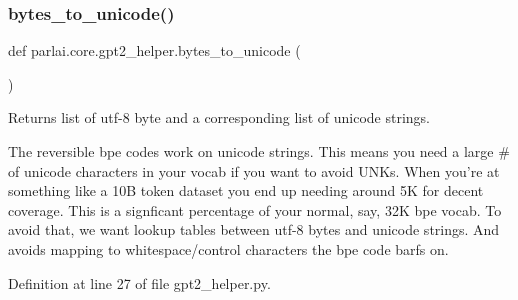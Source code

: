 \subsubsection{\texorpdfstring{bytes\+\_\+to\+\_\+unicode()}{bytes\_to\_unicode()}}
{\footnotesize\ttfamily def parlai.\+core.\+gpt2\+\_\+helper.\+bytes\+\_\+to\+\_\+unicode (\begin{DoxyParamCaption}{ }\end{DoxyParamCaption})}

\begin{DoxyVerb}Returns list of utf-8 byte and a corresponding list of unicode strings.

The reversible bpe codes work on unicode strings. This means you need a large # of
unicode characters in your vocab if you want to avoid UNKs. When you're at something
like a 10B token dataset you end up needing around 5K for decent coverage. This is a
signficant percentage of your normal, say, 32K bpe vocab. To avoid that, we want
lookup tables between utf-8 bytes and unicode strings. And avoids mapping to
whitespace/control characters the bpe code barfs on.
\end{DoxyVerb}
 

Definition at line 27 of file gpt2\+\_\+helper.\+py.


